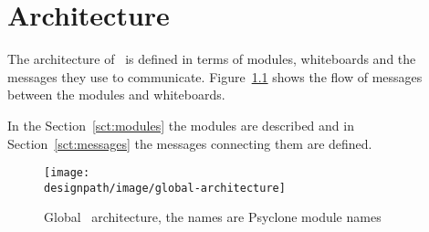\chapter{\label{cpt:architecture}Architecture}

The architecture of \Amber\ is defined in terms of modules, whiteboards and the
messages they use to communicate. Figure~\ref{fig:global-architecture} shows
the flow of messages between the modules and whiteboards.

In the Section~\ref{sct:modules} the modules are described and in
Section~\ref{sct:messages} the messages connecting them are defined. %

\begin{figure}
    \centering
    \texttt{[image: \\designpath/image/global-architecture]}
    \caption{\label{fig:global-architecture}Global \Amber\ architecture, the
              names are Psyclone module names}
\end{figure}





% 

